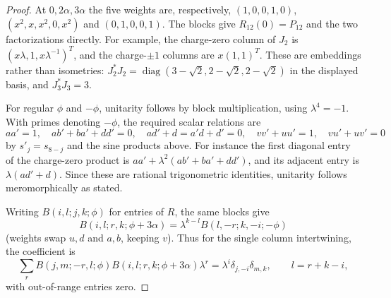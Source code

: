\begin{proof}
At $0,2\alpha,3\alpha$ the five weights are, respectively,
$(1,0,0,1,0)$, $(x^2,x,x^2,0,x^2)$ and $(0,1,0,0,1)$.
The blocks give $R_{12}(0)=P_{12}$ and the two factorizations directly. For example,
the charge-zero column of $J_2$ is
$(x\lambda,1,x\lambda^{-1})^T$, and the charge-$\pm1$ columns are
$x(1,1)^T$. These are embeddings rather than isometries:
$J_2^*J_2=\operatorname{diag}(3-\sqrt2,2-\sqrt2,2-\sqrt2)$ in the
displayed basis, and $J_3^*J_3=3$.

For regular $\phi$ and $-\phi$, unitarity follows by block multiplication,
using $\lambda^4=-1$. With primes denoting $-\phi$, the required scalar
relations are
\[
aa'=1,\quad ab'+ba'+dd'=0,\quad ad'+d=a'd+d'=0,
 \quad vv'+uu'=1,\quad vu'+uv'=0
\]
by $s'_j=s_{8-j}$ and the sine products above. For instance the first
diagonal entry of the charge-zero product is
$aa'+\lambda^2(ab'+ba'+dd')$, and its adjacent entry is
$\lambda(ad'+d)$. Since these are rational trigonometric identities,
unitarity follows meromorphically as stated.

Writing $B(i,l;j,k;\phi)$ for entries of $R$, the same blocks give
\[
B(i,l;r,k;\phi+3\alpha)=\lambda^{k-l}B(l,-r;k,-i;-\phi)
\]
(weights swap $u,d$ and $a,b$, keeping $v$). Thus for the single column intertwining, the coefficient is
\[
\sum_r B(j,m;-r,l;\phi) B(i,l;r,k;\phi+3\alpha)\lambda^r
=\lambda^i\delta_{j,-i}\delta_{m,k},\qquad l=r+k-i,
\]
with out-of-range entries zero.


\end{proof}
